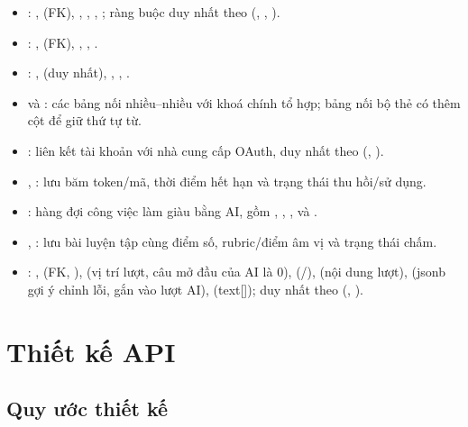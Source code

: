 \begin{itemize}
  \item {}: ,  (FK),
        , , , ;
        ràng buộc duy nhất theo (, ,
        ).
  \item {}: ,  (FK),
        , , .
  \item {}: ,  (duy nhất), ,
        , .
  \item {} và : các bảng nối
        nhiều--nhiều với khoá chính tổ hợp; bảng nối bộ thẻ có thêm cột
         để giữ thứ tự từ.
  \item {}: liên kết tài khoản với nhà cung cấp OAuth,
        duy nhất theo (, ).
  \item {}, : lưu băm
        token/mã, thời điểm hết hạn và trạng thái thu hồi/sử dụng.
  \item {}: hàng đợi công việc làm giàu bằng AI,
        gồm , , ,
         và .
  \item {}, : lưu bài
        luyện tập cùng điểm số, rubric/điểm âm vị và trạng thái chấm.
  \item {}: ,  (FK,
        ),  (vị trí lượt, câu mở đầu của AI là
        0),  (/),  (nội dung lượt),
         (jsonb gợi ý chỉnh lỗi, gắn vào lượt AI),
         (text[]); duy nhất theo (,
        ).
\end{itemize}

\section{Thiết kế API}
\label{sec:thiet-ke-api}

\subsection{Quy ước thiết kế}
\label{subsec:quy-uoc-api}

